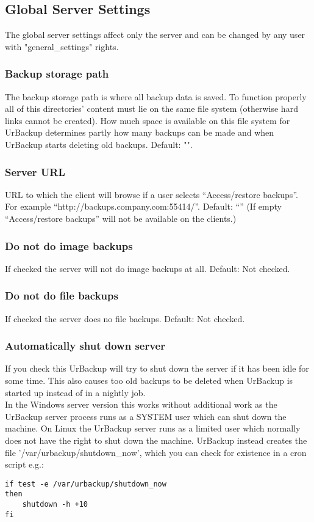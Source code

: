 \documentclass[a4paper,10pt]{article}
\begin{document}
\subsection{Global Server Settings}

The global server settings affect only the server and can be changed by any user
with "general\_settings" rights.

\subsubsection{Backup storage path}

The backup storage path is where all backup data is saved. To function properly all of this directories' content must lie on the same file system (otherwise hard links cannot be created). How much space is available on this file system for UrBackup determines partly how many backups can be made and when UrBackup starts deleting old backups. Default: "".

\subsubsection{Server URL}

URL to which the client will browse if a user selects ``Access/restore backups''. For example ``http://backups.company.com:55414/''. Default: ``'' (If empty ``Access/restore backups'' will not be available on the clients.)

\subsubsection{Do not do image backups}

If checked the server will not do image backups at all. Default: Not checked.

\subsubsection{Do not do file backups}

If checked the server does no file backups. Default: Not checked.

\subsubsection{Automatically shut down server}

If you check this UrBackup will try to shut down the server if it has been idle for some time. This also causes too old backups to be deleted when UrBackup is started up instead of in a nightly job.\\
In the Windows server version this works without additional work as the UrBackup
server process runs as a SYSTEM user which can shut down the machine. On Linux
the UrBackup server runs as a limited user which normally does not have the right to
shut down the machine. UrBackup instead creates the file
'/var/urbackup/shutdown\_now', which you can check for existence in a cron
script e.g.:
\begin{verbatim}
if test -e /var/urbackup/shutdown_now
then
	shutdown -h +10
fi
\end{verbatim}
\end{document}
